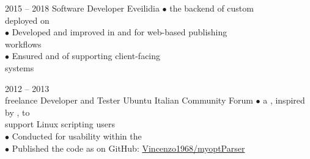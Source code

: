 \documentclass[9pt]{developercv} %
\newcommand{\myHilight}[2]{\tcbtp{\textit{\color{#1}{#2}}}}
\begin{document}
\begin{entrylist}
	\entry
		{2015 -- 2018} %
		{Software Developer}
		{Eveilidia}
        {
            $\bullet$ \myHilight{textcolor}{Maintained and debugged} the backend 
                      of custom \myHilight{textcolor}{on-demand book publishing platforms}\\ 
                      \hspace*{0.7em}deployed on \myHilight{textcolor}{Linux Fedora}\\
            $\bullet$ Developed and improved \myHilight{textcolor}{server-side routines} 
                      in \myHilight{textcolor}{Bash} and \myHilight{textcolor}{Python} 
                      for web-based publishing\\
                      \hspace*{0.7em}workflows\\
            $\bullet$ Ensured \myHilight{textcolor}{operational stability} 
                      and \myHilight{textcolor}{performance} of \myHilight{textcolor}{internal services} 
                      supporting client-facing\\
                      \hspace*{0.7em}systems\\
        }

	\entry
		{2012 -- 2013\\\footnotesize{freelance}}
		{Developer and Tester}
		{Ubuntu Italian Community Forum}
        {
            $\bullet$ \myHilight{textcolor}{Initiated and co-developed} 
                      a \myHilight{textcolor}{command-line parser in C}, 
                      inspired by \myHilight{textcolor}{Python’s argparse}, to\\
                      \hspace*{0.7em}support Linux scripting users\\
            $\bullet$ Conducted \myHilight{textcolor}{testing and documentation} 
                      for usability within the \myHilight{textcolor}{Ubuntu Italian user base}\\
            $\bullet$ Published the code as \myHilight{textcolor}{myoptParser} 
                      on GitHub: \href{https://github.com/Vincenzo1968/myoptParser}{Vincenzo1968/myoptParser}\\
        }


\end{entrylist}
\end{document}
